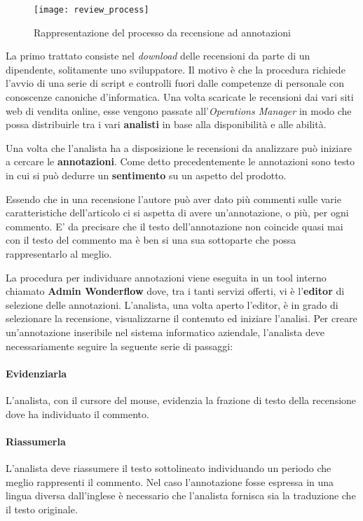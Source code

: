 \begin{figure}[ht]
\begin{center}
\texttt{[image: review\_process]}
\caption{Rappresentazione del processo da recensione ad annotazioni}
\label{fig:review_process}
\end{center}
\end{figure}

La primo trattato consiste nel \textit{download} delle recensioni da parte di
un dipendente, solitamente uno sviluppatore. Il motivo è che la procedura
richiede l'avvio di una serie di \gls{script} e controlli fuori dalle
competenze di personale con conoscenze canoniche d'informatica.
Una volta scaricate le recensioni dai vari siti web di vendita online, esse
vengono passate all'\textit{Operations Manager} in modo che possa distribuirle
tra i vari \textbf{analisti} in base alla disponibilità e alle abilità.

Una volta che l'analista ha a disposizione le recensioni da analizzare può
iniziare a cercare le \textbf{annotazioni}. Come detto precedentemente le
annotazioni sono testo in cui si può dedurre un \textbf{sentimento} su un
aspetto del prodotto.

Essendo che in una recensione l'autore può aver dato più commenti sulle varie
caratteristiche dell'articolo ci si aspetta di avere un'annotazione, o più, per
ogni commento. E' da precisare che il testo dell'annotazione non coincide quasi
mai con il testo del commento ma è ben si una sua sottoparte che possa
rappresentarlo al meglio.

La procedura per individuare annotazioni viene eseguita in un tool interno
chiamato \textbf{Admin Wonderflow} dove, tra i tanti servizi offerti, vi è
l'\textbf{editor} di selezione delle annotazioni. L'analista, una volta aperto
l'editor, è in grado di selezionare la recensione, visualizzarne il contenuto ed
iniziare l'analisi. Per creare un'annotazione inseribile nel sistema
informatico aziendale, l'analista deve necessariamente seguire la seguente
serie di passaggi:

\paragraph{Evidenziarla}
\label{evidenziarla}
L'analista, con il cursore del mouse, evidenzia la frazione di testo della
recensione dove ha individuato il commento.

\paragraph{Riassumerla}
\label{riassumerla}
L'analista deve riassumere il testo sottolineato individuando un periodo che
meglio rappresenti il commento. Nel caso l'annotazione fosse espressa in una
lingua diversa dall'inglese è necessario che l'analista fornisca sia la
traduzione che il testo originale.

